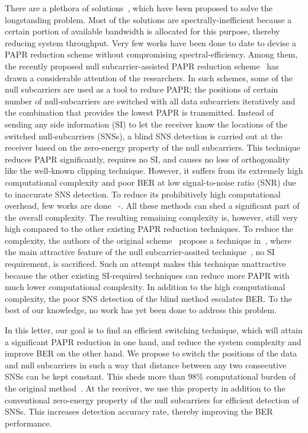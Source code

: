 \documentclass[journal,comsoc]{IEEEtran}
\begin{document}
There are a plethora of solutions~\cite{rahmat}, which have been proposed to solve the longstanding problem. Most of the solutions are spectrally-inefficient because a certain portion of available bandwidth is allocated for this purpose, thereby reducing system throughput. Very few works have been done to date to devise a PAPR reduction scheme without compromising spectral-efficiency. Among them, the recently proposed null subcarrier-assisted PAPR reduction scheme~\cite{wong1} has drawn a considerable attention of the researchers. In such schemes, some of the null subcarriers are used as a tool to reduce PAPR; the positions of certain number of null-subcarriers are switched with all data subcarriers iteratively and the combination that provides the lowest PAPR is transmitted. Instead of sending any side information (SI) to let the receiver know the locations of the switched null-subcarriers (SNSs), a blind SNS detection is carried out at the receiver based on the zero-energy property of the null subcarriers. This technique reduces PAPR significantly, requires no SI, and causes no loss of orthogonality like the well-known clipping technique. However, it suffers from its extremely high computational complexity and poor BER at low signal-to-noise ratio (SNR) due to inaccurate SNS detection. To reduce its prohibitively high computational overhead, few works are done~\cite{sabbir1} -\cite{sabbir3}. All these methods can shed a significant part of the overall complexity. The resulting remaining complexity is, however, still very high compared to the other existing PAPR reduction techniques. To reduce the complexity, the authors of the original scheme~\cite{wong1} propose a technique in~\cite{wong2}, where the main attractive feature of the null subcarrier-assited technique~\cite{wong2}, no SI requirement, is sacrificed. Such an attempt makes this technique unattractive because the other existing SI-required techniques can reduce more PAPR with much lower computational complexity. In addition to the high computational complexity, the poor SNS detection of the blind method escalates BER. To the best of our knowledge, no work has yet been done to address this problem. 

In this letter, our goal is to find an efficient switching technique, which will attain a significant PAPR reduction in one hand, and reduce the system complexity and improve BER on the other hand.  We propose to switch the positions of the data and null subcarriers in such a way that distance between any two consecutive SNSs can be kept constant. This sheds more than 98\% computational burden of the original method~\cite{wong1}. At the receiver, we use this property in addition to the conventional zero-energy property of the null subcarriers for efficient detection of SNSs. This increases detection accuracy rate, thereby improving the BER performance.
\end{document}
